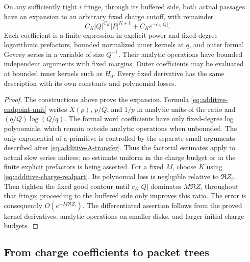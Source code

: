 \begin{proposition}\label{prop:additive-charge}
On any sufficiently tight $i$ fringe, through its buffered side, both
actual passages have an expansion to an arbitrary fixed charge cutoff,
with remainder
\begin{equation}\label{eq:additive-charge-remainder}
 C_K|Q|^{C_K}|P|^{K+1}+C_Ke^{-c_K|Q|}.
\end{equation}
Each coefficient is a finite expression in explicit power and
fixed-degree logarithmic prefactors, bounded normalized inner kernels
at $q$, and outer formal Gevrey series in a variable of size $Q^{-1}$.
Their analytic operations have bounded independent arguments with
fixed margins.  Outer coefficients may be evaluated at bounded inner
kernels such as $H_0$.  Every fixed derivative has the same description
with its own constants and polynomial losses.
\end{proposition}

\begin{proof}
The constructions above prove the expansion.  Formula
\eqref{eq:additive-endpoint-unit} writes $X(p)$, $p/Q$, and $1/p$ in
analytic units of the ratio and $(q/Q)\log(Q/q)$.  The formal word
coefficients have only fixed-degree log polynomials, which remain
outside analytic operations when unbounded.  The only exponential of
a primitive is controlled by the separate small arguments described
after \eqref{eq:additive-A-transfer}.  Thus the factorial estimates
apply to actual slow series indices; no estimate uniform in the charge
budget or in the finite explicit prefactors is being asserted.
For a fixed $M$, choose $K$ using
\eqref{eq:additive-charge-realpart}.  Its polynomial loss is negligible
relative to $\Re Z_i$.  Then tighten the fixed good contour until
$c_K|Q|$ dominates $M\Re Z_i$ throughout that fringe; proceeding to
the buffered side only improves this ratio.  The error is consequently
$O(e^{-M\Re Z_i})$.  The differentiated assertion follows from the
proved kernel derivatives, analytic operations on smaller disks, and
larger initial charge budgets.
\end{proof}

\subsection{From charge coefficients to packet trees}

